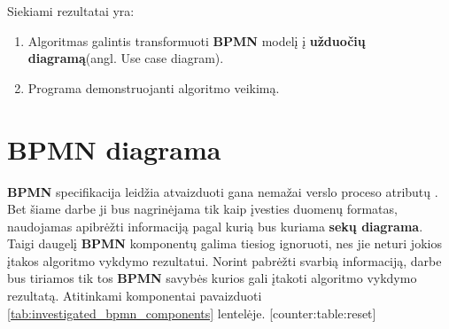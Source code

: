 \documentclass{VUMIFInfBakalaurinis}
\begin{document}
Siekiami rezultatai yra:
\begin{enumerate}
	\item Algoritmas galintis transformuoti \textbf{BPMN} modelį į \textbf{užduočių diagramą}(angl. Use case diagram).
	\item Programa demonstruojanti algoritmo veikimą.
\end{enumerate}


\section{BPMN diagrama}
\textbf{BPMN} specifikacija leidžia atvaizduoti gana nemažai verslo proceso atributų \cite{bpmnFormal}. Bet šiame darbe ji bus nagrinėjama tik kaip įvesties duomenų formatas, naudojamas apibrėžti informaciją pagal kurią bus kuriama \textbf{sekų diagrama}. Taigi daugelį \textbf{BPMN} komponentų galima tiesiog ignoruoti, nes jie neturi jokios įtakos algoritmo vykdymo rezultatui. Norint pabrėžti svarbią informaciją, darbe bus tiriamos tik tos \textbf{BPMN} savybės kurios gali įtakoti algoritmo vykdymo rezultatą. Atitinkami komponentai pavaizduoti \ref{tab:investigated_bpmn_components} lentelėje.
[counter:table:reset]
\newcommand\rownumber{\stepcounter{counter:table}\arabic{counter:table}}
\end{document}
